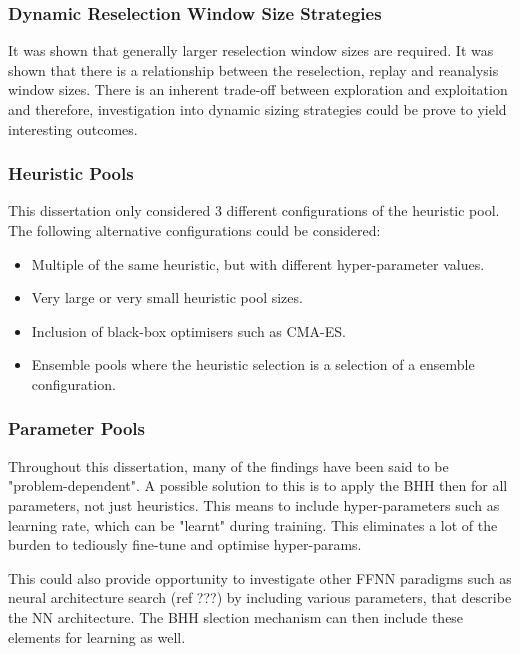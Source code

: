 \subsubsection{Dynamic Reselection Window Size Strategies}

It was shown that generally larger reselection window sizes are required. It was shown that there is a relationship between the reselection, replay and reanalysis window sizes. There is an inherent trade-off between exploration and exploitation and therefore, investigation into dynamic sizing strategies could be prove to yield interesting outcomes.

\subsubsection{Heuristic Pools}

This dissertation only considered 3 different configurations of the heuristic pool. The following alternative  configurations could be considered:

\begin{itemize}
	\item Multiple of the same heuristic, but with different hyper-parameter values.
	\item Very large or very small heuristic pool sizes.
	\item Inclusion of black-box optimisers such as CMA-ES.
	\item Ensemble pools where the heuristic selection is a selection of a ensemble configuration.
\end{itemize}

\subsubsection{Parameter Pools}

Throughout this dissertation, many of the findings have been said to be "problem-dependent". A possible solution to this is to apply the \ac{BHH} then for all parameters, not just heuristics. This means to include hyper-parameters such as learning rate, which can be "learnt" during training. This eliminates a lot of the burden to tediously fine-tune and optimise hyper-params.

This could also provide opportunity to investigate other \ac{FFNN} paradigms such as neural architecture search (ref ???) by including various parameters, that describe the \ac{NN} architecture. The \ac{BHH} slection mechanism can then include these elements for learning as well.

